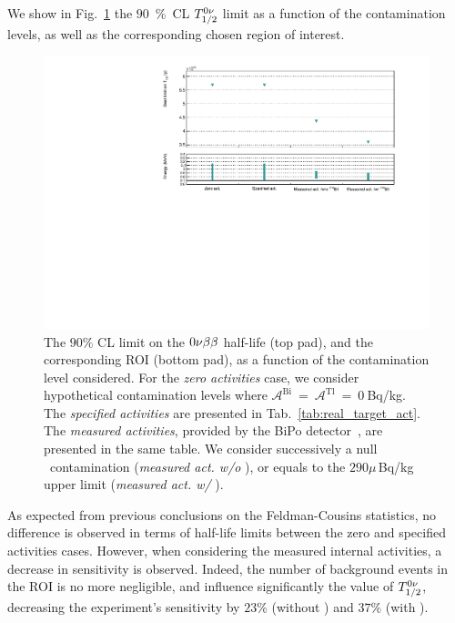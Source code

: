 We show in Fig.~\ref{fig:real_target_act} the $90$~\%~CL $T_{1/2}^{0\nu}$ limit as a function of the contamination levels, as well as the corresponding chosen region of interest.
\begin{figure}[h!]
  \centering
  \includegraphics[width=1.1\textwidth]{Sensitivity/fig_sensitivity/contamination_level_Se_B.pdf}
  \caption{The $90\%$ CL limit on the $0\nu\beta\beta$ half-life (top pad), and the corresponding ROI (bottom pad), as a function of the contamination level considered.
    For the \emph{zero activities} case, we consider hypothetical contamination levels where $\mathcal{A}^{\text{Bi}}~=~\mathcal{A}^{\text{Tl}}~=~0~$Bq/kg.
    The \emph{specified activities} are presented in Tab.~\ref{tab:real_target_act}.
    The \emph{measured activities}, provided by the BiPo detector~\cite{internal:bipo}, are presented in the same table.
    We consider successively a null \Bi\ contamination (\emph{measured act. w/o \Bi}), or equals to the $290\mu\,$Bq/kg upper limit (\emph{measured act. w/ \Bi}).
    \label{fig:real_target_act}}
\end{figure}
As expected from previous conclusions on the Feldman-Cousins statistics, no difference is observed in terms of half-life limits between the zero and specified activities cases.
However, when considering the measured internal activities, a decrease in sensitivity is observed.
Indeed, the number of background events in the ROI is no more negligible, and influence significantly the value of $T_{1/2}^{0\nu}$, decreasing the experiment's sensitivity by $23\%$ (without \Bi) and $37\%$ (with \Bi).


